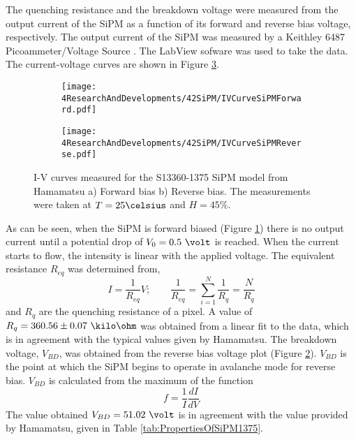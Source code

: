 The quenching resistance and the breakdown voltage were measured from the output current of the SiPM as a function of its forward and reverse bias voltage, respectively. The output current of the SiPM was measured by a Keithley 6487 Picoammeter/Voltage Source \cite{DataSheetKeithley6487}. The LabView sofware was used to take the data. The current-voltage curves are shown in Figure \ref{fig:IVcurveSiPM}.
\begin{figure}
\centering
    \begin{subfigure}[b]{0.9\textwidth}
    \centering
    \texttt{[image: 4ResearchAndDevelopments/42SiPM/IVCurveSiPMForward.pdf]}  
    \caption{\label{subfig:IVcurveForward}}
    \end{subfigure}
    \hfill
    \begin{subfigure}[b]{0.9\textwidth}
    \centering
    \texttt{[image: 4ResearchAndDevelopments/42SiPM/IVCurveSiPMReverse.pdf]}  
    \caption{\label{subfig:IVcurveReverse}}
    \end{subfigure}
 \caption{I-V curves measured for the S13360-1375 SiPM model from Hamamatsu a) Forward bias b) Reverse bias. The measurements were taken at $T=25\celsius$ and $H=45\%$.}
 \label{fig:IVcurveSiPM}
\end{figure}
As can be seen, when the SiPM is forward biased (Figure \ref{subfig:IVcurveForward}) there is no output current until a potential drop of $V_0= 0.5~\volt$ is reached. When the current starts to flow, the intensity is linear with the applied voltage. The equivalent resistance $R_{eq}$ was determined from, 
\begin{equation}
I=\frac{1}{R_{eq}}V;  \qquad \frac{1}{R_{eq}} = \sum_{i=1}^{N}\frac{1}{R_{q}}= \frac{N}{R_{q}}
\label{QuenchingResistance}
\end{equation}
and $R_{q}$ are the quenching resistance of a pixel. A value of $R_{q}= 360.56 \pm 0.07~\kilo\ohm$ was obtained from a linear fit to the data, which is in agreement with the typical values given by Hamamatsu. The breakdown voltage, $V_{BD}$, was obtained from the reverse bias voltage plot (Figure \ref{subfig:IVcurveReverse}). $V_{BD}$ is the point at which the SiPM begins to operate in avalanche mode for reverse bias. $V_{BD}$ is calculated from the maximum of the function 
\begin{equation}
f=\frac{1}{I}\frac{dI}{dV}
\label{BreakDownVoltageFunction}
\end{equation}
The value obtained $V_{BD}=51.02~\volt$ is in agreement with the value provided by Hamamatsu, given in Table \ref{tab:PropertiesOfSiPM1375}.


